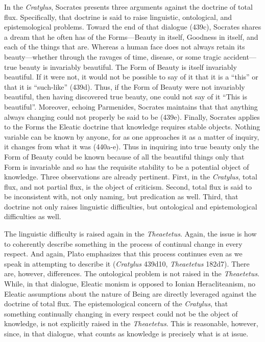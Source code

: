 In the \emph{Cratylus}, Socrates presents three arguments against the doctrine of total flux. Specifically, that doctrine is said to raise linguistic, ontological, and epistemological problems. Toward the end of that dialogue (439c), Socrates shares a dream that he often has of the Forms---Beauty in itself, Goodness in itself, and each of the things that are. Whereas a human face does not always retain its beauty---whether through the ravages of time, disease, or some tragic accident---true beauty is invariably beautiful. The Form of Beauty is itself invariably beautiful. If it were not, it would not be possible to say of it that it is a ``this'' or that it is ``such-like'' (439d). Thus, if the Form of Beauty were not invariably beautiful, then having discovered true beauty, one could not say of it ``This is beautiful''.  Moreover, echoing Parmenides, Socrates maintains that that anything always changing could not properly be said to be (439e). Finally, Socrates applies to the Forms the Eleatic doctrine that knowledge requires stable objects. Nothing variable can be known by anyone, for as one approaches it as a matter of inquiry, it changes from what it was (440a-e). Thus in inquiring into true beauty only the Form of Beauty could be known because of all the beautiful things only that Form is invariable and so has the requisite stability to be a potential object of knowledge. Three observations are already pertinent. First, in the \emph{Cratylus}, total flux, and not partial flux, is the object of criticism. Second, total flux is said to be inconsistent with, not only naming, but predication as well. Third, that doctrine not only raises linguistic difficulties, but ontological and epistemological difficulties as well.

The linguistic difficulty is raised again in the \emph{Theaetetus}. Again, the issue is how to coherently describe something in the process of continual change in every respect. And again, Plato emphasizes that this process continues even as we speak in attempting to describe it (\emph{Cratylus} 439d10, \emph{Theaetetus} 182d7). There are, however, differences. The ontological problem is not raised in the \emph{Theaetetus}. While, in that dialogue, Eleatic monism is opposed to Ionian Heracliteanism, no Eleatic assumptions about the nature of Being are directly leveraged against the doctrine of total flux. The epistemological concern of the \emph{Cratylus}, that something continually changing in every respect could not be the object of knowledge, is not explicitly raised in the \emph{Theaetetus}. This is reasonable, however, since, in that dialogue, what counts as knowledge is precisely what is at issue. 

